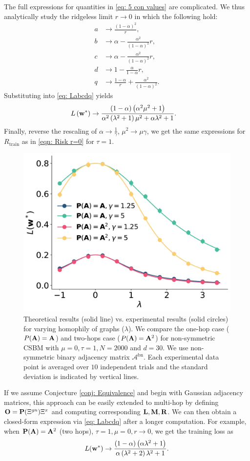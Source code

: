 \documentclass[9pt,twocolumn]{pnas-new}
\begin{document}
The full expressions for quantities in \eqref{eq: 5 con values} are complicated. We thus analytically study the ridgeless limit $r \to 0$ in which the following hold:
\begin{equation*}
    \begin{aligned}
     a &\to \frac{\left(1-\alpha\right)^{2}}{r},\\
     b &\to \alpha-\frac{\alpha^{2}}{\left(1-\alpha\right)^{2}}r,\\
     c &\to \alpha-\frac{\alpha^{2}}{\left(1-\alpha\right)^{2}}r,\\
     d &\to 1-\frac{\alpha}{1-\alpha}r,\\
     q &\to\frac{1-\alpha}{r}+\frac{\alpha^{2}}{\left(1-\alpha\right)^{2}}.
    \end{aligned}
\end{equation*}
Substituting into \eqref{eq: Labcdq} yields
\begin{align*}
L\left(\mathbf{w}^{*}\right) & \to \frac{(1-\alpha)\left(\alpha^{2}\mu^{2}+1\right)}{\alpha^{2}\left(\lambda^{2}+1\right)\mu^{2}+\alpha\lambda^{2}+1}.
\end{align*}
Finally, reverse the rescaling of $\alpha\to\frac{1}{\gamma}$, $\mu^{2}\to\mu\gamma$, we get the same expressions for $R_{\text{train}}$ as in \eqref{eqn: Risk r=0} for $\tau = 1$.


\begin{figure}[!ht]
    \centering
    \includegraphics[width=0.45\linewidth]{fig/f_two_hops.pdf}
    \caption{Theoretical results (solid line)  vs. experimental results (solid circles) for varying homophily of graphs ($\lambda$). We compare the one-hop case ($P(\mathbf{A})=\mathbf{A}$) and two-hops case ($P(\mathbf{A})=\mathbf{A}^2$) for non-symmetric CSBM with $\mu=0,\tau = 1, N=2000$ and $d=30$. We use non-symmetric binary adjacency matrix $\mathcal{A}^{\text{bn}}$. Each experimental data point is averaged over $10$ independent trials and the standard deviation is indicated by vertical lines.}
    \label{fig: two hops}
\end{figure}

If we assume Conjecture \ref{conj: Equivalence} and begin with Gaussian adjacency matrices, this approach can be easily extended to multi-hop by defining $\mathbf{O}=\mathbf{P}(\Xi^{gn})\Xi^x$ and computing corresponding $\mathbf{L},\mathbf{M},\mathbf{R}$. We can then obtain a closed-form expression via \eqref{eq: Labcdq} after a longer computation. For example, when $\mathbf{P}(\mathbf{A})=\mathbf{A}^2$ (two hops), $\tau=1, \mu=0, r \to 0$, we get the training loss as  
\begin{equation*}
    L(\mathbf{w}^*)\to\frac{(1-\alpha) \left(\alpha  \lambda ^2+1\right)}{\alpha  \left(\lambda ^2+2\right) \lambda ^2+1}.
\end{equation*}
\end{document}
